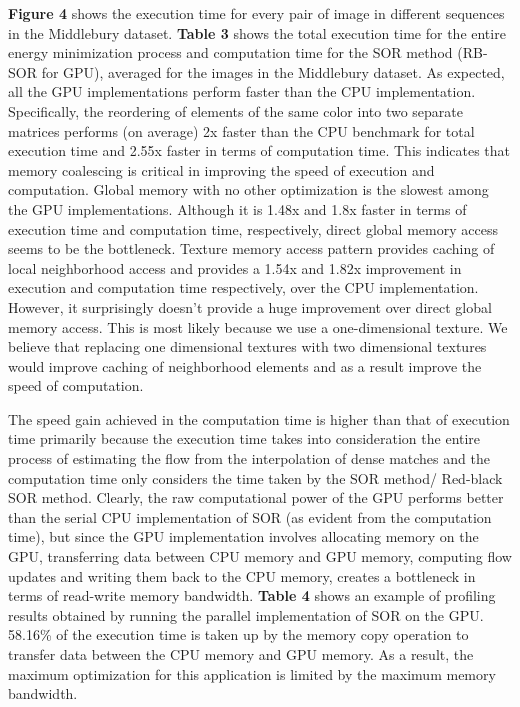 \documentclass[english]{article}
\newcommand{\csvautotabularcenter}[2][]{\csvloop{autotabularcenter={#2},#1}}
\begin{document}
	\textbf{Figure 4} shows the execution time for every pair of image in different sequences in the Middlebury dataset. \textbf{Table 3} shows the total execution time for the entire energy minimization process and computation time for the SOR method (RB-SOR for GPU), averaged for the images in the Middlebury dataset. As expected, all the GPU implementations perform faster than the CPU implementation. Specifically, the reordering of elements of the same color into two separate matrices performs (on average) 2x faster than the CPU benchmark for total execution time and 2.55x faster in terms of computation time. This indicates that memory coalescing is critical in improving the speed of execution and computation. Global memory with no other optimization is the slowest among the GPU implementations. Although it is 1.48x and 1.8x faster in terms of execution time and computation time, respectively, direct global memory access seems to be the bottleneck. Texture memory access pattern provides caching of local neighborhood access and provides a 1.54x and 1.82x improvement in execution and computation time respectively, over the CPU implementation. However, it surprisingly doesn’t provide a huge improvement over direct global memory access. This is most likely because we use a one-dimensional texture. We believe that replacing one dimensional textures with two dimensional textures would improve caching of neighborhood elements and as a result improve the speed of computation.

	\begin{center}
	\csvautotabularcenter{results/tables/3_compute_time.csv}	
	\end{center}

	The speed gain achieved in the computation time is  higher than that of execution time primarily because the execution time takes into consideration the entire process of estimating the flow from the interpolation of dense matches and the computation time only considers the time taken by the SOR method/ Red-black SOR method. Clearly, the raw computational power of the GPU performs better than the serial CPU implementation of SOR (as evident from the computation time), but since the GPU implementation involves allocating memory on the GPU, transferring data between CPU memory and GPU memory, computing flow updates and writing them back to the CPU memory, creates a bottleneck in terms of read-write memory bandwidth. \textbf{Table 4} shows an example of profiling results obtained by running the parallel implementation of SOR on the GPU. 58.16\% of the execution time is taken up by the memory copy operation to transfer data between the CPU memory and GPU memory. As a result, the maximum optimization for this application is limited by the maximum memory bandwidth.
\end{document}

